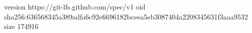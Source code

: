 version https://git-lfs.github.com/spec/v1
oid sha256:636568345a389adfa6c92e6696182bceea5eb3087404a2208345631f3aaa9532
size 174916
